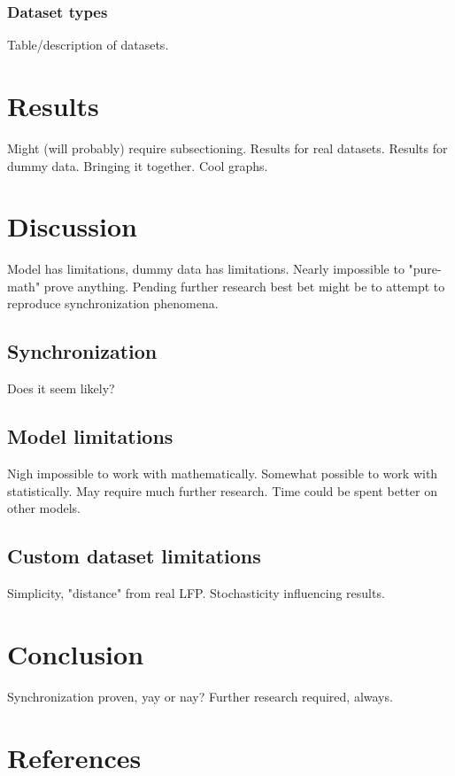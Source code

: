 \documentclass{article}
\begin{document}
\subsubsection{Dataset types}
Table/description of datasets.

\newpage
\section{Results}
Might (will probably) require subsectioning.
Results for real datasets.
Results for dummy data.
Bringing it together.
Cool graphs.

\newpage
\section{Discussion}
Model has limitations, dummy data has limitations.
Nearly impossible to "pure-math" prove anything.
Pending further research best bet might be to attempt to reproduce synchronization phenomena.

\subsection{Synchronization}
Does it seem likely?

\subsection{Model limitations}
Nigh impossible to work with mathematically.
Somewhat possible to work with statistically.
May require much further research.
Time could be spent better on other models.

\subsection{Custom dataset limitations}
Simplicity, "distance" from real LFP.
Stochasticity influencing results.

\newpage
\section{Conclusion}
Synchronization proven, yay or nay?
Further research required, always.

\newpage
\section{References}

\end{document}
